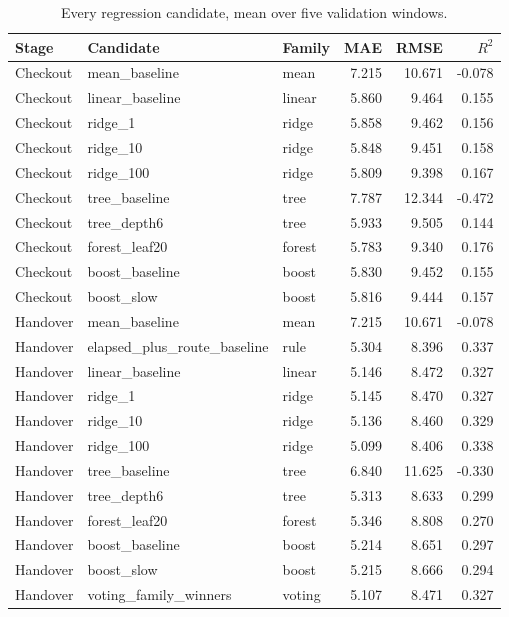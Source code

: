 \begin{table}[H]
\centering\small
\caption{Every regression candidate, mean over five validation windows.}
\label{tab:app-regression}
\begin{tabular}{@{}lllrrr@{}}
\toprule
Stage & Candidate & Family & MAE & RMSE & $R^2$ \\
\midrule
Checkout & mean\_baseline & mean & 7.215 & 10.671 & -0.078 \\
Checkout & linear\_baseline & linear & 5.860 & 9.464 & 0.155 \\
Checkout & ridge\_1 & ridge & 5.858 & 9.462 & 0.156 \\
Checkout & ridge\_10 & ridge & 5.848 & 9.451 & 0.158 \\
Checkout & ridge\_100 & ridge & 5.809 & 9.398 & 0.167 \\
Checkout & tree\_baseline & tree & 7.787 & 12.344 & -0.472 \\
Checkout & tree\_depth6 & tree & 5.933 & 9.505 & 0.144 \\
Checkout & forest\_leaf20 & forest & 5.783 & 9.340 & 0.176 \\
Checkout & boost\_baseline & boost & 5.830 & 9.452 & 0.155 \\
Checkout & boost\_slow & boost & 5.816 & 9.444 & 0.157 \\
Handover & mean\_baseline & mean & 7.215 & 10.671 & -0.078 \\
Handover & elapsed\_plus\_route\_baseline & rule & 5.304 & 8.396 & 0.337 \\
Handover & linear\_baseline & linear & 5.146 & 8.472 & 0.327 \\
Handover & ridge\_1 & ridge & 5.145 & 8.470 & 0.327 \\
Handover & ridge\_10 & ridge & 5.136 & 8.460 & 0.329 \\
Handover & ridge\_100 & ridge & 5.099 & 8.406 & 0.338 \\
Handover & tree\_baseline & tree & 6.840 & 11.625 & -0.330 \\
Handover & tree\_depth6 & tree & 5.313 & 8.633 & 0.299 \\
Handover & forest\_leaf20 & forest & 5.346 & 8.808 & 0.270 \\
Handover & boost\_baseline & boost & 5.214 & 8.651 & 0.297 \\
Handover & boost\_slow & boost & 5.215 & 8.666 & 0.294 \\
Handover & voting\_family\_winners & voting & 5.107 & 8.471 & 0.327 \\
\bottomrule
\end{tabular}
\end{table}